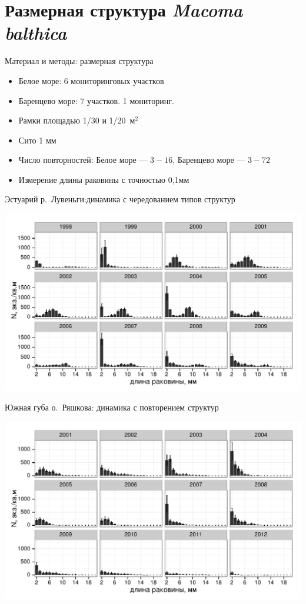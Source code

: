 \documentclass{beamer}
\begin{document}
		\section[Размерная структура]{Размерная структура {\it Macoma balthica}}
\begin{frame}{Материал и методы: размерная структура}
\begin{itemize}
	\item Белое море: 6 мониторинговых участков
	\item Баренцево море: 7 участков. 1 мониторинг.
	\item Рамки площадью 1/30 и 1/20~м$^2$
	\item Сито 1 мм
	\item Число повторностей: Белое море --- $3-16$, Баренцево море --- $3-72$
	\item Измерение длины раковины с точностью 0,1мм
\end{itemize}
\end{frame}

\begin{frame}{Эстуарий р.~Лувеньги:динамика с чередованием типов структур}
 \begin{center}
		\includegraphics[width=\textwidth]{Estuary_sizestr_oneplot.pdf}
 \end{center}
\end{frame}

\begin{frame}{Южная губа о.~Ряшкова: динамика с повторением структур}
 \begin{center}
		\includegraphics[width=\textwidth]{YuG_sizestr_oneplot.pdf}
 \end{center}
\end{frame}
\end{document}
